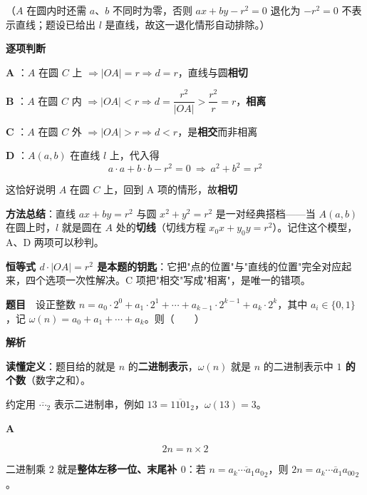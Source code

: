（$A$ 在圆内时还需 $a$、$b$ 不同时为零，否则 $ax+by-r^{2}=0$ 退化为 $-r^{2}=0$ 不表示直线；题设已给出 $l$ 是直线，故这一退化情形自动排除。）

\par\medskip

\textbf{逐项判断}

\textbf{A }：$A$ 在圆 $C$ 上 $\Rightarrow|OA|=r\Rightarrow d=r$，直线与圆\textbf{相切} 

\textbf{B }：$A$ 在圆 $C$ 内 $\Rightarrow|OA|<r\Rightarrow d=\dfrac{r^{2}}{|OA|}>\dfrac{r^{2}}r=r$，\textbf{相离} 

\textbf{C }：$A$ 在圆 $C$ 外 $\Rightarrow|OA|>r\Rightarrow d<r$，是\textbf{相交}而非相离 

\textbf{D }：$A(a,b)$ 在直线 $l$ 上，代入得
\[a\cdot a+b\cdot b-r^{2}=0\ \Longrightarrow\ a^{2}+b^{2}=r^{2}\]

这恰好说明 $A$ 在圆 $C$ 上，回到 A 项的情形，故\textbf{相切} 


\begin{gktip}
\textbf{方法总结}：直线 $ax+by=r^{2}$ 与圆 $x^{2}+y^{2}=r^{2}$ 是一对经典搭档——当 $A(a,b)$ 在圆上时，$l$ 就是圆在 $A$ 处的\textbf{切线}（切线方程 $x_0x+y_0y=r^{2}$）。记住这个模型，A、D 两项可以秒判。

\textbf{恒等式 $d\cdot|OA|=r^{2}$ 是本题的钥匙}：它把"点的位置"与"直线的位置"完全对应起来，四个选项一次性解决。C 项把"相交"写成"相离"，是唯一的错项。
\end{gktip}

\par\medskip


\textbf{题目}　设正整数 $n=a_0\cdot2^{0}+a_1\cdot2^{1}+\cdots+a_{k-1}\cdot2^{k-1}+a_k\cdot2^{k}$，其中 $a_i\in\{0,1\}$，记 $\omega(n)=a_0+a_1+\cdots+a_k$。则（　　）

\textbf{解析}

\textbf{读懂定义}：题目给的就是 $n$ 的\textbf{二进制表示}，$\omega(n)$ 就是 $n$ 的二进制表示中 \textbf{$1$ 的个数}（数字之和）。

约定用 $\overline{\cdots}_2$ 表示二进制串，例如 $13=\overline{1101}_2$，$\omega(13)=3$。

\par\medskip

\textbf{A }

\[2n=n\times2\]

二进制乘 $2$ 就是\textbf{整体左移一位、末尾补 $0$}：若 $n=\overline{a_k\cdots a_1a_0}_2$，则 $2n=\overline{a_k\cdots a_1a_00}_2$。

